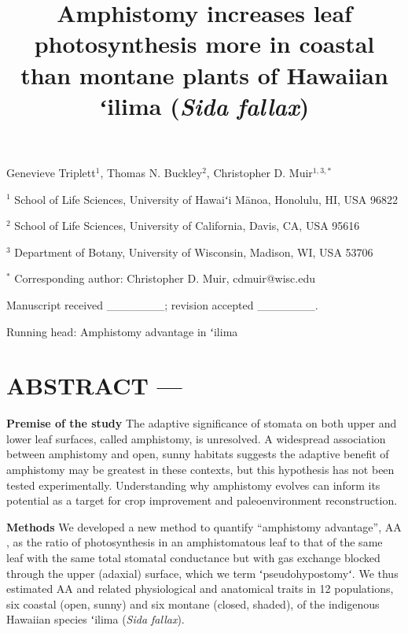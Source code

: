 \documentclass[
  letterpaper,
  DIV=11,
  numbers=noendperiod]{scrartcl}
\title{Amphistomy increases leaf photosynthesis more in coastal than
montane plants of Hawaiian ʻilima (\emph{Sida fallax})}
\author{}
\date{}
\begin{document}
\maketitle
\ifdefined\Shaded\renewenvironment{Shaded}{\begin{tcolorbox}[breakable, sharp corners, borderline west={3pt}{0pt}{shadecolor}, boxrule=0pt, interior hidden, frame hidden, enhanced]}{\end{tcolorbox}}\fi

\begin{center}
Genevieve Triplett$^1$, Thomas N. Buckley$^2$, Christopher D. Muir$^{1,3,*}$
\end{center}

\(^1\) School of Life Sciences, University of Hawaiʻi Mānoa, Honolulu,
HI, USA 96822

\(^2\) School of Life Sciences, University of California, Davis, CA, USA
95616

\(^3\) Department of Botany, University of Wisconsin, Madison, WI, USA
53706

\(^*\) Corresponding author: Christopher D. Muir, cdmuir@wisc.edu

Manuscript received \_\_\_\_\_\_\_; revision accepted \_\_\_\_\_\_\_.

Running head: Amphistomy advantage in ʻilima

\newpage

\hypertarget{abstract}{%
\section{ABSTRACT ---}\label{abstract}}

\noindent \textbf{Premise of the study} The adaptive significance of
stomata on both upper and lower leaf surfaces, called amphistomy, is
unresolved. A widespread association between amphistomy and open, sunny
habitats suggests the adaptive benefit of amphistomy may be greatest in
these contexts, but this hypothesis has not been tested experimentally.
Understanding why amphistomy evolves can inform its potential as a
target for crop improvement and paleoenvironment reconstruction.

\textbf{Methods} We developed a new method to quantify ``amphistomy
advantage'', \(\mathrm{AA}\), as the ratio of photosynthesis in an
amphistomatous leaf to that of the same leaf with the same total
stomatal conductance but with gas exchange blocked through the upper
(adaxial) surface, which we term ʻpseudohypostomyʻ. We thus estimated
\(\mathrm{AA}\) and related physiological and anatomical traits in 12
populations, six coastal (open, sunny) and six montane (closed, shaded),
of the indigenous Hawaiian species ʻilima (\emph{Sida fallax}).
\end{document}
